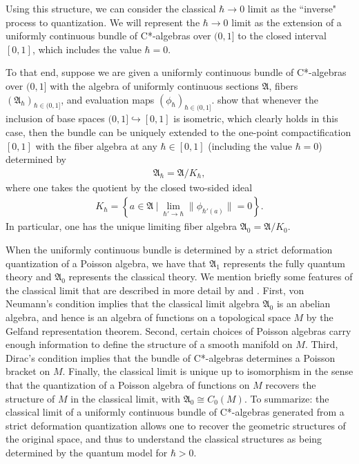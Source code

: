 \documentclass[sn-mathphys,Numbered]{sn-jnl}
\providecommand{\norm}[1]{\lVert#1\rVert}
\begin{document}
Using this structure, we can consider the classical $\hbar\to 0$ limit as the ``inverse" process to quantization.  We will represent the $\hbar\to 0$ limit as the extension of a uniformly continuous bundle of C*-algebras over $(0,1]$ to the closed interval $[0,1]$, which includes the value $\hbar=0$.

To that end, suppose we are given a uniformly continuous bundle of C*-algebras over $(0,1]$ with the algebra of uniformly continuous sections $\mathfrak{A}$, fibers $(\mathfrak{A}_\hbar)_{\hbar\in (0,1]}$, and evaluation maps $(\phi_\hbar)_{\hbar\in (0,1]}$.  \citet{StFe21a} show that whenever the inclusion of base spaces $(0,1]\hookrightarrow [0,1]$ is isometric, which clearly holds in this case, then the bundle can be uniquely extended to the one-point compactification $[0,1]$ with the fiber algebra at any $\hbar\in [0,1]$ (including the value $\hbar =0$) determined by
\begin{align}
    \mathfrak{A}_\hbar = \mathfrak{A}/K_\hbar,
\end{align}
where one takes the quotient by the closed two-sided ideal
\begin{align}
\label{eq:ideal}
    K_\hbar = \left\{a\in\mathfrak{A}\ |\ \lim_{\hbar'\to \hbar}\norm{\phi_{\hbar'(a)}} = 0\right\}.
\end{align}
In particular, one has the unique limiting fiber algebra $\mathfrak{A}_0 = \mathfrak{A}/K_0$.

When the uniformly continuous bundle is determined by a strict deformation quantization of a Poisson algebra, we have that $\mathfrak{A}_1$ represents the fully quantum theory and $\mathfrak{A}_0$ represents the classical theory.  We mention briefly some features of the classical limit that are described in more detail by \citet{StFe21a} and \citet{FeSt24}. First, von Neumann's condition implies that the classical limit algebra $\mathfrak{A}_0$ is an abelian algebra, and hence is an algebra of functions on a topological space $M$ by the Gelfand representation theorem.  Second, certain choices of Poisson algebras carry enough information to define the structure of a smooth manifold on $M$. Third, Dirac's condition implies that the bundle of C*-algebras determines a Poisson bracket on $M$.  Finally, the classical limit is unique up to isomorphism in the sense that the quantization of a Poisson algebra of functions on $M$ recovers the structure of $M$ in the classical limit, with $\mathfrak{A}_0\cong C_0(M)$.  To summarize: the classical limit of a uniformly continuous bundle of C*-algebras generated from a strict deformation quantization allows one to recover the geometric structures of the original space, and thus to understand the classical structures as being determined by the quantum model for $\hbar>0$.
\end{document}
